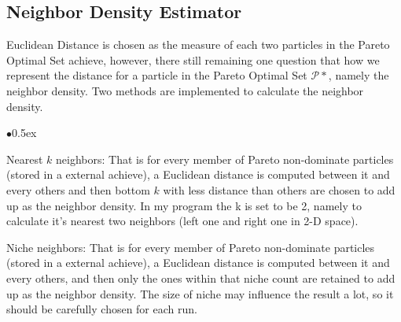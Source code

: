 \documentclass[12pt, runningheads,a4paper]{llncs}
\begin{document}
\subsection{Neighbor Density Estimator}
Euclidean Distance is chosen as the measure of each two particles in the Pareto Optimal Set achieve, however, there still remaining one question that how we represent the distance for a particle in the Pareto Optimal Set $\mathcal{P}*$, namely the neighbor density. Two methods are implemented to calculate the neighbor density. 
\begin{list}{$\bullet$}{\itemsep 0.5ex}
\item Nearest $k$ neighbors: That is for every member of Pareto non-dominate particles (stored in a external achieve), a Euclidean distance is computed between it and every others and then bottom $k$ with less distance than others are chosen to add up as the neighbor density. In my program the k is set to be 2, namely to calculate it's nearest two neighbors (left one and right one in 2-D space).
\item Niche neighbors: That is for every member of Pareto non-dominate particles (stored in a external achieve), a Euclidean distance is computed between it and every others, and then only the ones within that niche count are retained to add up as the neighbor density. The size of niche may influence the result a lot, so it should be carefully chosen for each run.
\end{list}
\end{document}
